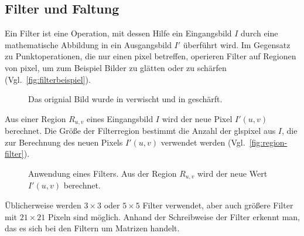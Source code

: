 \subsection{Filter und Faltung} %
\label{sub:filter}
Ein Filter ist eine Operation, mit dessen Hilfe ein Eingangsbild $I$ durch eine mathematische Abbildung in ein
 Ausgangsbild $I'$ überführt wird. Im Gegensatz zu Punktoperationen, die nur einen \gls{pixel} betreffen, operieren
 Filter auf Regionen von \gls{pixel}, um zum Beispiel Bilder zu glätten oder zu schärfen
 (Vgl.~\autoref{fig:filterbeispiel}).
\begin{figure}[!ht]
	\centering
	\caption{Das orignial Bild  wurde in
	  verwischt und in  geschärft.}
	\label{fig:filterbeispiel}
\end{figure}

Aus einer Region $R_{u,v}$ eines Eingangsbild $I$ wird der neue Pixel $I'(u,v)$ berechnet. Die Größe der
 Filterregion bestimmt die Anzahl der gls{pixel} aus $I$, die zur Berechnung des neuen Pixels $I'(u,v)$ verwendet
 werden (Vgl.~\autoref{fig:region-filter}).
\begin{figure}[!ht]
	\centering
	
	\caption{Anwendung eines Filters. Aus der Region $R_{u,v}$ wird der neue Wert $I'(u,v)$ berechnet.}
	\label{fig:region-filter}
\end{figure}
Üblicherweise werden $3 \times 3$ oder $5 \times 5$ Filter verwendet, aber auch größere Filter mit $21 \times 21$
 Pixeln sind möglich. Anhand der Schreibweise der Filter erkennt man, das es sich bei den Filtern um Matrizen handelt.

